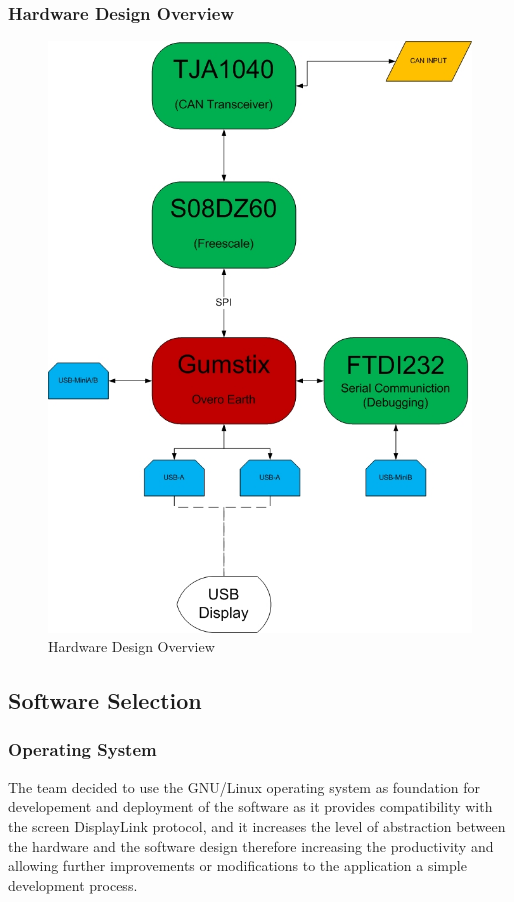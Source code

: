 \documentclass[11pt,a4wide]{article}
\begin{document}
\subsubsection{Hardware Design Overview}

\begin{figure}[H]
\centering
\includegraphics[scale=0.4]{High_Level_Schematic.jpg}
\caption{Hardware Design Overview}
\label{fig:hard_overview}
\end{figure}

\subsection{Software Selection}
\subsubsection{Operating System}
The team decided to use the GNU/Linux operating system as foundation for developement and deployment of the software as it provides compatibility with the screen DisplayLink protocol, and it increases the level of abstraction between the hardware and the software design therefore increasing the productivity and allowing further improvements or modifications to the application a simple development process.
\end{document}
